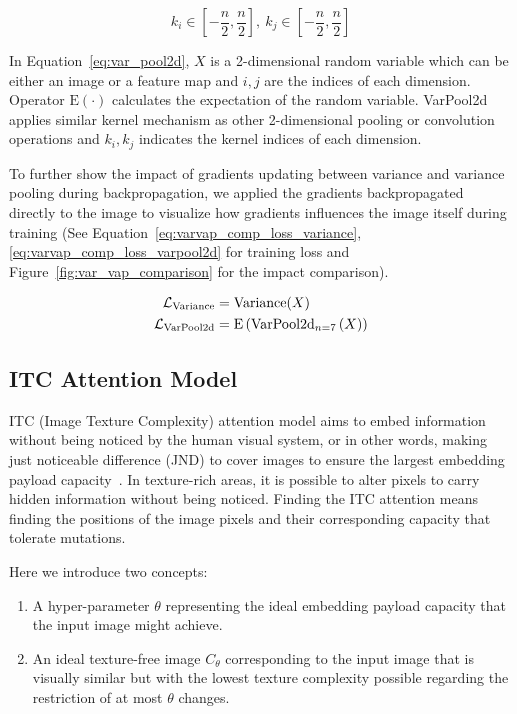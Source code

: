 \begin{equation*}%
  k_i \in \left[ -\frac{n}{2}, \frac{n}{2} \right],~ k_j \in \left[ -\frac{n}{2}, \frac{n}{2} \right]
  \label{eq:var_pool2d_cond}
\end{equation*}

In Equation~\ref{eq:var_pool2d}, \(X\) is a 2-dimensional random variable which can be either an image or a feature map and \(i, j\) are the indices of each dimension. Operator \(\mathrm{E}(\cdot)\) calculates the expectation of the random variable. VarPool2d applies similar kernel mechanism as other 2-dimensional pooling or convolution operations and \(k_i, k_j\) indicates the kernel indices of each dimension.

To further show the impact of gradients updating between variance and variance pooling during backpropagation, we applied the gradients backpropagated directly to the image to visualize how gradients influences the image itself during training (See Equation~\ref{eq:varvap_comp_loss_variance},\ref{eq:varvap_comp_loss_varpool2d} for training loss and Figure~\ref{fig:var_vap_comparison} for the impact comparison).

\begin{align}
    \mathcal{L}_\mathrm{Variance}  &= \mathrm{Variance}(X) \label{eq:varvap_comp_loss_variance} \\
    \mathcal{L}_\mathrm{VarPool2d} &= \mathrm{E} \left( \mathrm{VarPool2d}_{n=7} \left( X \right) \right) \label{eq:varvap_comp_loss_varpool2d}
\end{align}

\figureVarVapComparison%

\subsection{ITC Attention Model}

ITC (Image Texture Complexity) attention model aims to embed information without being noticed by the human visual system, or in other words, making just noticeable difference (JND) to cover images to ensure the largest embedding payload capacity~\cite{JND}. In texture-rich areas, it is possible to alter pixels to carry hidden information without being noticed. Finding the ITC attention means finding the positions of the image pixels and their corresponding capacity that tolerate mutations.

Here we introduce two concepts:
\begin{enumerate}
  \item A hyper-parameter \( \theta \) representing the ideal embedding payload capacity that the input image might achieve.
  \item An ideal texture-free image \(C_{\theta}\) corresponding to the input image that is visually similar but with the lowest texture complexity possible regarding the restriction of at most \( \theta \) changes.
\end{enumerate}

